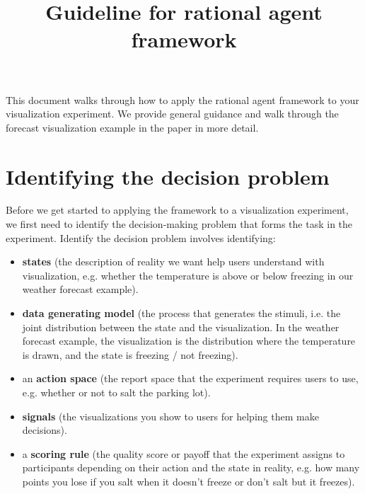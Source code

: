 \documentclass{article}
\title{Guideline for rational agent framework}
\begin{document}
\maketitle




\begin{Schunk}
\end{Schunk}

This document walks through how to apply the rational agent framework to your visualization experiment. We provide general guidance and walk through the forecast visualization example in the paper in more detail.

\section{Identifying the decision problem}

Before we get started to applying the framework to a visualization experiment, we first need to identify the decision-making problem that forms the task in the experiment. Identify the decision problem involves identifying:

\begin{itemize}
    \item \textbf{states} (the description of reality we want help users understand with visualization, e.g. whether the temperature is above or below freezing in our weather forecast example).
    \item \textbf{data generating model} (the process that generates the stimuli, i.e. the joint distribution between the state and the visualization. In the weather forecast example, the visualization is the distribution where the temperature is drawn, and the state is freezing / not freezing).
    \item an \textbf{action space} (the report space that the experiment requires users to use, e.g. whether or not to salt the parking lot).
    \item \textbf{signals} (the visualizations you show to users for helping them make decisions).
    \item a \textbf{scoring rule} (the quality score or payoff that the experiment assigns to participants depending on their action and the state in reality, e.g. how many points you lose if you salt when it doesn't freeze or don't salt but it freezes).
\end{itemize}
\end{document}
